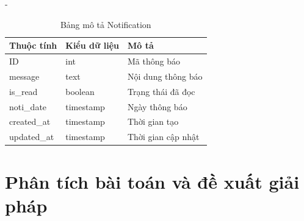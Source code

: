 \begin {list} {-}{}
\begin{itemize}
        \begin{table}[H]
            \begin{tabular}{|p{3cm}|p{3cm}|p{8cm}|}
            \hline
            \textbf{Thuộc tính} & \textbf{Kiểu dữ liệu} & \textbf{Mô tả}         \\ \hline
            ID                  & int                   & Mã thông báo           \\ \hline
            message             & text                  & Nội dung thông báo      \\ \hline
            is\_read            & boolean               & Trạng thái đã đọc      \\ \hline
            noti\_date         & timestamp             & Ngày thông báo         \\ \hline
            created\_at         & timestamp             & Thời gian tạo          \\ \hline
            updated\_at         & timestamp             & Thời gian cập nhật     \\ \hline
            \end{tabular}
            \caption{Bảng mô tả Notification}
        \label{table:5}
        \end{table}
\end{itemize}

\section{Phân tích bài toán và đề xuất giải pháp}


\end{list}
